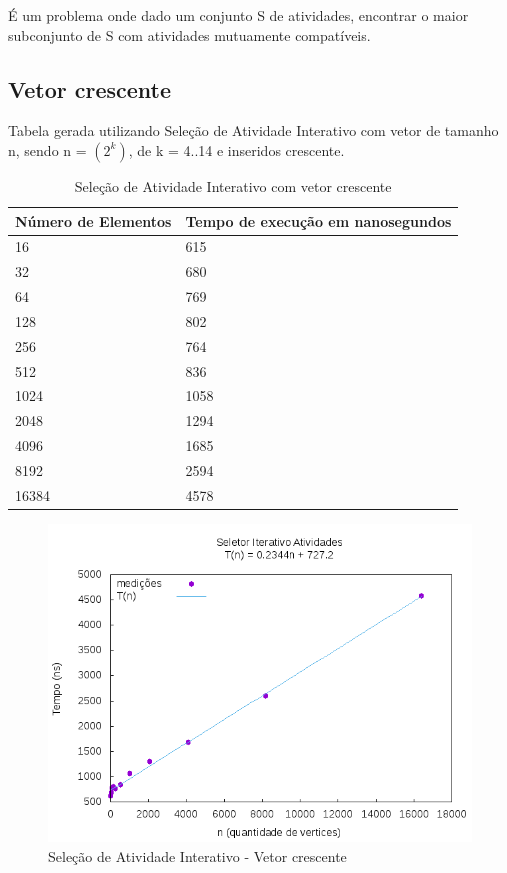 \documentclass[12pt,a4paper,twoside]{report}
\begin{document}
É um problema onde dado um conjunto S de atividades, encontrar o maior subconjunto de S com
atividades mutuamente compatíveis.

\subsection{Vetor crescente}
Tabela gerada utilizando Seleção de Atividade Interativo com vetor de tamanho n, sendo n = $(2^k)$, de k = 4..14 e inseridos crescente.
\begin{table}[H]
\centering
\caption{Seleção de Atividade Interativo com vetor crescente}
\label{my-label}
\begin{tabular}{|l|l|}
\hline
\multicolumn{1}{|c|}{\textbf{Número de Elementos}} & \multicolumn{1}{c|}{\textbf{Tempo de execução em nanosegundos}} \\ \hline
16 & 615 \\ \hline
32 & 680 \\ \hline
64 & 769 \\ \hline
128 & 802 \\ \hline
256 & 764 \\ \hline
512 & 836 \\ \hline
1024 & 1058 \\ \hline
2048 & 1294 \\ \hline
4096 & 1685 \\ \hline
8192 & 2594 \\ \hline
16384 & 4578 \\ \hline

\end{tabular}
\end{table}

\begin{figure}[H]
    \centering
    \includegraphics[width=0.7\linewidth]{graficos/SeletorIterativoAtividades/SeletorIterativoAtividades.png}
  \caption{Seleção de Atividade Interativo - Vetor crescente}
\end{figure}
\end{document}
